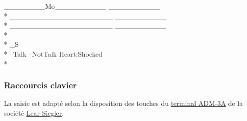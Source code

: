 \documentclass{report}
\begin{document}
\begin{tabbing}
     \_\_\_\_\_\_\_\_Mo\_\_\_\_\_\_\_\_\_\_ \_\_\_\_\_\_\_\_\_\_ \\*
     \_\_\_\_\_\_\_\_\_\_\_\_\_\_\_\_\_\_\_\_ \_\_\_\_\_\_\_\_\_\_ \\*
     \_\_\_\_\_\_\_\_\_\_\_\_\_\_\_\_\_\_\_\_ \_\_\_\_\_\_\_\_\_\_ \\*
    \\*
    \_S \\*
    --Talk --NotTalk Heart:Shocked \\*
\end{tabbing}

\subsubsection{Raccourcis clavier}

La saisie est adapté selon la disposition des touches du \href{https://en.wikipedia.org/wiki/ADM-3A}{terminal ADM-3A} de la société \href{https://en.wikipedia.org/wiki/Lear_Siegler}{Lear Siegler}.
\end{document}
